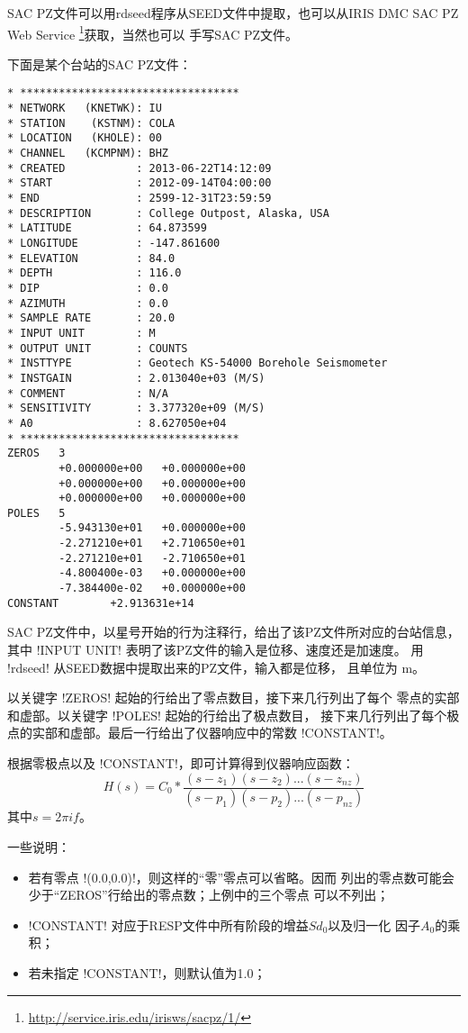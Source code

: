 SAC PZ文件可以用rdseed程序从SEED文件中提取，也可以从IRIS DMC SAC PZ Web Service
\footnote{\url{http://service.iris.edu/irisws/sacpz/1/}}获取，当然也可以
手写SAC PZ文件。

下面是某个台站的SAC PZ文件：
\begin{verbatim}
* **********************************
* NETWORK   (KNETWK): IU
* STATION    (KSTNM): COLA
* LOCATION   (KHOLE): 00
* CHANNEL   (KCMPNM): BHZ
* CREATED           : 2013-06-22T14:12:09
* START             : 2012-09-14T04:00:00
* END               : 2599-12-31T23:59:59
* DESCRIPTION       : College Outpost, Alaska, USA
* LATITUDE          : 64.873599
* LONGITUDE         : -147.861600
* ELEVATION         : 84.0
* DEPTH             : 116.0
* DIP               : 0.0
* AZIMUTH           : 0.0
* SAMPLE RATE       : 20.0
* INPUT UNIT        : M
* OUTPUT UNIT       : COUNTS
* INSTTYPE          : Geotech KS-54000 Borehole Seismometer
* INSTGAIN          : 2.013040e+03 (M/S)
* COMMENT           : N/A
* SENSITIVITY       : 3.377320e+09 (M/S)
* A0                : 8.627050e+04
* **********************************
ZEROS   3
        +0.000000e+00   +0.000000e+00
        +0.000000e+00   +0.000000e+00
        +0.000000e+00   +0.000000e+00
POLES   5
        -5.943130e+01   +0.000000e+00
        -2.271210e+01   +2.710650e+01
        -2.271210e+01   -2.710650e+01
        -4.800400e-03   +0.000000e+00
        -7.384400e-02   +0.000000e+00
CONSTANT        +2.913631e+14
\end{verbatim}

SAC PZ文件中，以星号开始的行为注释行，给出了该PZ文件所对应的台站信息，
其中 !INPUT UNIT! 表明了该PZ文件的输入是位移、速度还是加速度。
用 !rdseed! 从SEED数据中提取出来的PZ文件，输入都是位移，
且单位为 \si{\m}。

以关键字 !ZEROS! 起始的行给出了零点数目，接下来几行列出了每个
零点的实部和虚部。以关键字 !POLES! 起始的行给出了极点数目，
接下来几行列出了每个极点的实部和虚部。最后一行给出了仪器响应中的常数
!CONSTANT!。

根据零极点以及 !CONSTANT!，即可计算得到仪器响应函数：
\[
    H(s) = C_0 * \frac{(s-z_1)(s-z_2)...(s-z_{nz})}{(s-p_1)(s-p_2)...(s-p_{nz})}
\]
其中$s=2\pi i f$。

一些说明：
\begin{itemize}
\item 若有零点 !(0.0,0.0)!，则这样的``零''零点可以省略。因而
    列出的零点数可能会少于``ZEROS''行给出的零点数；上例中的三个零点
    可以不列出；
\item !CONSTANT! 对应于RESP文件中所有阶段的增益$Sd_0$以及归一化
    因子$A_0$的乘积；
\item 若未指定 !CONSTANT!，则默认值为1.0；
\end{itemize}

